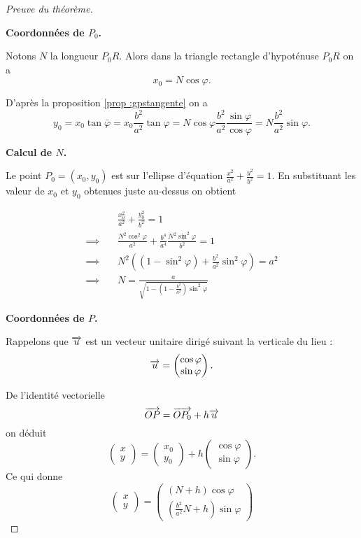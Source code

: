 \documentclass[class=report,crop=false]{standalone}
\begin{document}
\begin{proof}[Preuve du théorème]~

\textbf{Coordonnées de $P_0$.}  

Notons $N$ la longueur $P_0R$.
Alors dans la triangle rectangle d'hypoténuse $P_0R$ on a 
$$x_0 = N \cos \varphi.$$

D'après la proposition \ref{prop :gpstangente} on a
$$y_0 = x_0 \tan \bar\varphi = x_0 \frac{b^2}{a^2} \tan \varphi 
= N \cos \varphi\frac{b^2}{a^2} \frac{\sin\varphi}{\cos \varphi} = N\frac{b^2}{a^2}\sin\varphi.$$


\textbf{Calcul de $N$.}   

Le point $P_0 = (x_0,y_0)$ est sur l'ellipse d'équation 
$\frac{x^2}{a^2}+\frac{y^2}{b^2} = 1$.
En substituant les valeur de $x_0$ et $y_0$ obtenues juste au-dessus on obtient

\begin{align*}
         & \quad \frac{x_0^2}{a^2}+\frac{y_0^2}{b^2} = 1 \\
\implies & \quad \frac{N^2 \cos^2 \varphi}{a^2}+\frac{b^4}{a^4}\frac{N^2 \sin^2 \varphi}{b^2} = 1 \\
\implies & \quad N^2 \left( (1-\sin^2\varphi) + \frac{b^2}{a^2}\sin^2 \varphi \right) = a^2 \\
\implies & \quad N = \frac{a}{\sqrt{1-\left(1-\frac{b^2}{a^2}\right)\sin^2 \varphi}}
\end{align*}

\textbf{Coordonnées de $P$.} 

Rappelons que $\overrightarrow u$ est un vecteur unitaire dirigé suivant la verticale du lieu :
$$ \overrightarrow{u} = \begin{pmatrix}\cos \varphi \\ \sin \varphi \end{pmatrix}.$$

De l'identité vectorielle 
$$\overrightarrow{OP} = \overrightarrow{OP_0} + h \overrightarrow{u}$$
on déduit 
$$\begin{pmatrix}x\\y\end{pmatrix}
= \begin{pmatrix}x_0\\y_0\end{pmatrix} + h \begin{pmatrix}\cos \varphi \\ \sin \varphi \end{pmatrix}.$$
Ce qui donne
$$\begin{pmatrix}x\\y\end{pmatrix}
= \begin{pmatrix}(N+h) \cos \varphi \\ 
  \left(\frac{b^2}{a^2}N+h\right)\sin\varphi  
  \end{pmatrix}$$

\end{proof}
\end{document}
